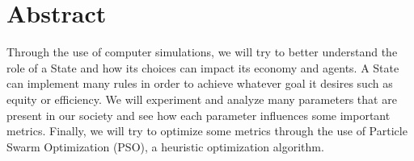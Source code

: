 \chapter*{Abstract}



Through the use of computer simulations, we will try to better understand the role of a State and how its choices can impact its economy and agents. A State can implement many rules in order to achieve whatever goal it desires such as equity or efficiency. We will experiment and analyze many parameters that are present in our society and see how each parameter influences some important metrics. Finally, we will try to optimize some metrics through the use of Particle Swarm Optimization (PSO), a heuristic optimization algorithm.

